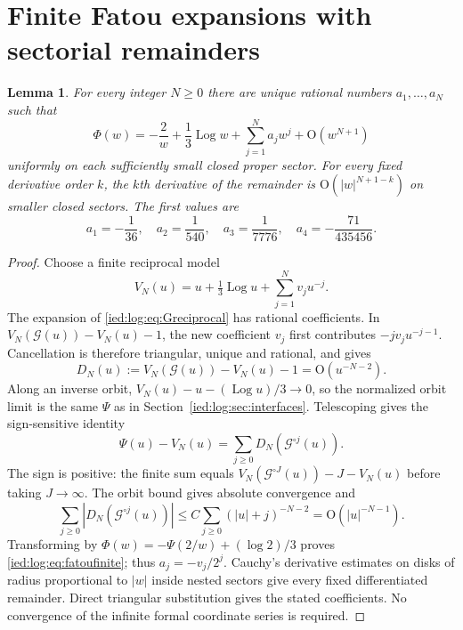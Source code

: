 \documentclass[11pt,letterpaper]{article}
\newtheorem{lemma}[theorem]{Lemma}
\theoremstyle{remark}\newtheorem{remark}[theorem]{Remark}
\newcommand{\Oh}{\mathrm O}\newcommand{\supp}{\operatorname{supp}}
\newcommand{\Log}{\operatorname{Log}}
\begin{document}
\section{Finite Fatou expansions with sectorial remainders}\label{ied:log:sec:fatou}
\begin{lemma}\label{ied:log:lem:finitefatou}
For every integer $N\ge0$ there are unique rational numbers $a_1,\ldots,a_N$ such that
\begin{equation}\label{ied:log:eq:fatoufinite}
 \Phi(w)=-\frac2w+\frac13\Log w+\sum_{j=1}^N a_jw^j
                    +\Oh(w^{N+1})
\end{equation}
uniformly on each sufficiently small closed proper sector. For every fixed derivative order $k$, the $k$th derivative of the remainder is $\Oh(|w|^{N+1-k})$ on smaller closed sectors. The first values are
\[
 a_1=-\frac1{36},\quad a_2=\frac1{540},\quad
 a_3=\frac1{7776},\quad a_4=-\frac{71}{435456}.
\]
\end{lemma}
\begin{proof}
Choose a finite reciprocal model
\[
 V_N(u)=u+\tfrac13\Log u+\sum_{j=1}^N v_ju^{-j}.
\]
The expansion of \eqref{ied:log:eq:Greciprocal} has rational coefficients. In
$V_N(\mathcal G(u))-V_N(u)-1$, the new coefficient $v_j$ first contributes
$-jv_ju^{-j-1}$. Cancellation is therefore triangular, unique and rational, and gives
\[
 D_N(u):=V_N(\mathcal G(u))-V_N(u)-1=\Oh(u^{-N-2}).
\]
Along an inverse orbit, $V_N(u)-u-(\Log u)/3\to0$, so the normalized orbit limit is the same $\Psi$ as in Section~\ref{ied:log:sec:interfaces}. Telescoping gives the sign-sensitive identity
\begin{equation}\label{ied:log:eq:defectsum}
 \Psi(u)-V_N(u)=\sum_{j\ge0}D_N(\mathcal G^{\circ j}(u)).
\end{equation}
The sign is positive: the finite sum equals
$V_N(\mathcal G^{\circ J}(u))-J-V_N(u)$ before taking $J\to\infty$.
The orbit bound gives absolute convergence and
\[
 \sum_{j\ge0}|D_N(\mathcal G^{\circ j}(u))|
 \le C\sum_{j\ge0}(|u|+j)^{-N-2}=\Oh(|u|^{-N-1}).
\]
Transforming by $\Phi(w)=-\Psi(2/w)+(\log2)/3$ proves
\eqref{ied:log:eq:fatoufinite}; thus $a_j=-v_j/2^j$. Cauchy's derivative estimates on disks of radius proportional to $|w|$ inside nested sectors give every fixed differentiated remainder. Direct triangular substitution gives the stated coefficients. No convergence of the infinite formal coordinate series is required.
\end{proof}
\end{document}
